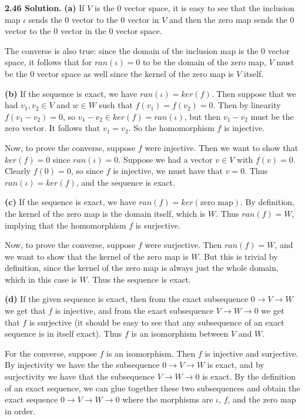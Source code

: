 \textbf{2.46 Solution.} \textbf{(a)} If $V$ is the 0 vector space, it is easy to see that the inclusion map $\iota$ sends the 0 vector to the 0 vector in $V$ and then the zero map sends the 0 vector to the 0 vector in the 0 vector space.

The converse is also true: since the domain of the inclusion map is the 0 vector space, it follows that for $ran(\iota) = 0$ to be the domain of the zero map, $V$ must be the 0 vector space as well since the kernel of the zero map is $V$ itself.

\textbf{(b)} If the sequence is exact, we have $ran(\iota) = ker(f)$. Then suppose that we had $v_1, v_2 \in V$ and $w \in W$ such that $f(v_1) = f(v_2) = 0$. Then by linearity $f(v_1 - v_2) = 0$, so $v_1 - v_2 \in ker(f) = ran(\iota)$, but then $v_1 - v_2$ must be the zero vector. It follows that $v_1 = v_2$. So the homomorphism $f$ is injective.

Now, to prove the converse, suppose $f$ were injective. Then we want to show that $ker(f) = 0$ since $ran(\iota) = 0$. Suppose we had a vector $v \in V$ with $f(v) = 0$. Clearly $f(0) = 0$, so since $f$ is injective, we must have that $v = 0$. Thus $ran(\iota) = ker(f)$, and the sequence is exact.

\textbf{(c)} If the sequence is exact, we have $ran(f) = ker(\text{zero map})$. By definition, the kernel of the zero map is the domain itself, which is $W$. Thus $ran(f) = W$, implying that the homomorphism $f$ is surjective.

Now, to prove the converse, suppose $f$ were surjective. Then $ran(f) = W$, and we want to show that the kernel of the zero map is $W$. But this is trivial by definition, since the kernel of the zero map is always just the whole domain, which in this case is $W$. Thus the sequence is exact.

\textbf{(d)} If the given sequence is exact, then from the exact subsequence $0 \to V \to W$ we get that $f$ is injective, and from the exact subsequence $V \to W \to 0$ we get that $f$ is surjective (it should be easy to see that any subsequence of an exact sequence is in itself exact). Thus $f$ is an isomorphism between $V$ and $W$.

For the converse, suppose $f$ is an isomorphism. Then $f$ is injective and surjective. By injectivity we have the the subsequence $0 \to V \to W$ is exact, and by surjectivity we have that the subsequence $V \to W \to 0$ is exact. By the definition of an exact sequence, we can glue together these two subsequences and obtain the exact sequence $0 \to V \to W \to 0$ where the morphisms are $\iota$, $f$, and the zero map in order.

